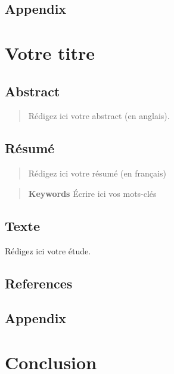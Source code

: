 \documentclass[12pt]{ulaval}
\begin{document}
\hypertarget{appendix}{%
\section{Appendix}\label{appendix}}

\hypertarget{votre-titre-1}{%
\chapter{Votre titre}\label{votre-titre-1}}

\hypertarget{abstract-1}{%
\section{Abstract}\label{abstract-1}}

\begin{quote}
Rédigez ici votre abstract (en anglais).
\end{quote}

\hypertarget{ruxe9sumuxe9-1}{%
\section{Résumé}\label{ruxe9sumuxe9-1}}

\begin{quote}
Rédigez ici votre résumé (en français)
\end{quote}

\begin{quote}
\textbf{Keywords}
Écrire ici vos mots-clés
\end{quote}

\hypertarget{texte-1}{%
\section{Texte}\label{texte-1}}

Rédigez ici votre étude.

\hypertarget{references-1}{%
\section{References}\label{references-1}}

\hypertarget{appendix-1}{%
\section{Appendix}\label{appendix-1}}

\hypertarget{conclusion}{%
\chapter*{Conclusion}\label{conclusion}}
\end{document}
